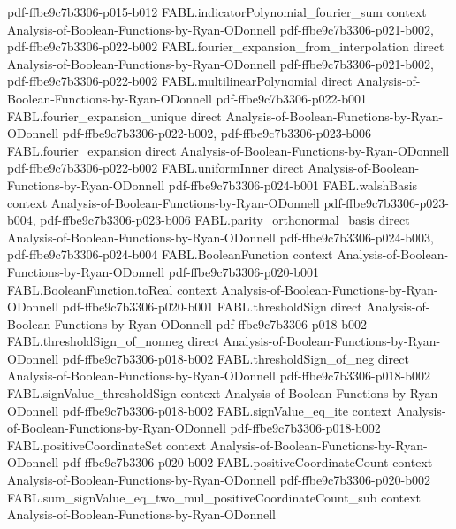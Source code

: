 \begin{theorem}
  {pdf-ffbe9c7b3306-p015-b012}
\proofstep
  {FABL.indicatorPolynomial_fourier_sum}
  {context}
  {Analysis-of-Boolean-Functions-by-Ryan-ODonnell}
  {pdf-ffbe9c7b3306-p021-b002,
    pdf-ffbe9c7b3306-p022-b002}
\proofstep
  {FABL.fourier_expansion_from_interpolation}
  {direct}
  {Analysis-of-Boolean-Functions-by-Ryan-ODonnell}
  {pdf-ffbe9c7b3306-p021-b002,
    pdf-ffbe9c7b3306-p022-b002}
\proofstep
  {FABL.multilinearPolynomial}
  {direct}
  {Analysis-of-Boolean-Functions-by-Ryan-ODonnell}
  {pdf-ffbe9c7b3306-p022-b001}
\proofstep
  {FABL.fourier_expansion_unique}
  {direct}
  {Analysis-of-Boolean-Functions-by-Ryan-ODonnell}
  {pdf-ffbe9c7b3306-p022-b002,
    pdf-ffbe9c7b3306-p023-b006}
\proofstep
  {FABL.fourier_expansion}
  {direct}
  {Analysis-of-Boolean-Functions-by-Ryan-ODonnell}
  {pdf-ffbe9c7b3306-p022-b002}
\proofstep
  {FABL.uniformInner}
  {direct}
  {Analysis-of-Boolean-Functions-by-Ryan-ODonnell}
  {pdf-ffbe9c7b3306-p024-b001}
\proofstep
  {FABL.walshBasis}
  {context}
  {Analysis-of-Boolean-Functions-by-Ryan-ODonnell}
  {pdf-ffbe9c7b3306-p023-b004,
    pdf-ffbe9c7b3306-p023-b006}
\proofstep
  {FABL.parity_orthonormal_basis}
  {direct}
  {Analysis-of-Boolean-Functions-by-Ryan-ODonnell}
  {pdf-ffbe9c7b3306-p024-b003,
    pdf-ffbe9c7b3306-p024-b004}
\proofstep
  {FABL.BooleanFunction}
  {context}
  {Analysis-of-Boolean-Functions-by-Ryan-ODonnell}
  {pdf-ffbe9c7b3306-p020-b001}
\proofstep
  {FABL.BooleanFunction.toReal}
  {context}
  {Analysis-of-Boolean-Functions-by-Ryan-ODonnell}
  {pdf-ffbe9c7b3306-p020-b001}
\proofstep
  {FABL.thresholdSign}
  {direct}
  {Analysis-of-Boolean-Functions-by-Ryan-ODonnell}
  {pdf-ffbe9c7b3306-p018-b002}
\proofstep
  {FABL.thresholdSign_of_nonneg}
  {direct}
  {Analysis-of-Boolean-Functions-by-Ryan-ODonnell}
  {pdf-ffbe9c7b3306-p018-b002}
\proofstep
  {FABL.thresholdSign_of_neg}
  {direct}
  {Analysis-of-Boolean-Functions-by-Ryan-ODonnell}
  {pdf-ffbe9c7b3306-p018-b002}
\proofstep
  {FABL.signValue_thresholdSign}
  {context}
  {Analysis-of-Boolean-Functions-by-Ryan-ODonnell}
  {pdf-ffbe9c7b3306-p018-b002}
\proofstep
  {FABL.signValue_eq_ite}
  {context}
  {Analysis-of-Boolean-Functions-by-Ryan-ODonnell}
  {pdf-ffbe9c7b3306-p018-b002}
\proofstep
  {FABL.positiveCoordinateSet}
  {context}
  {Analysis-of-Boolean-Functions-by-Ryan-ODonnell}
  {pdf-ffbe9c7b3306-p020-b002}
\proofstep
  {FABL.positiveCoordinateCount}
  {context}
  {Analysis-of-Boolean-Functions-by-Ryan-ODonnell}
  {pdf-ffbe9c7b3306-p020-b002}
\proofstep
  {FABL.sum_signValue_eq_two_mul_positiveCoordinateCount_sub}
  {context}
  {Analysis-of-Boolean-Functions-by-Ryan-ODonnell}

\end{theorem}
